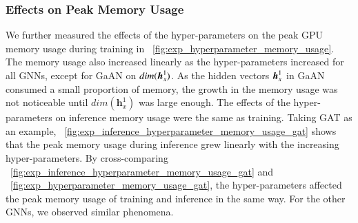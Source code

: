 \subsubsection{Effects on Peak Memory Usage}

We further measured the effects of the hyper-parameters on the peak GPU memory usage during training in \figurename~\ref{fig:exp_hyperparameter_memory_usage}.
%
The memory usage also increased linearly as the hyper-parameters increased for all GNNs, except for GaAN on $dim(\boldsymbol{h}^1_x)$.
%
As the hidden vectors $\boldsymbol{h}^1_x$ in GaAN consumed a small proportion of memory, the growth in the memory usage was not noticeable until $dim(\boldsymbol{h}^1_x)$ was large enough.
%
The effects of the hyper-parameters on inference memory usage were the same as training.
%
Taking GAT as an example, \figurename~\ref{fig:exp_inference_hyperparameter_memory_usage_gat} shows that the peak memory usage during inference grew linearly with the increasing hyper-parameters.
%
By cross-comparing \figurename~\ref{fig:exp_inference_hyperparameter_memory_usage_gat} and \figurename~\ref{fig:exp_hyperparameter_memory_usage_gat}, the hyper-parameters affected the peak memory usage of training and inference in the same way.
%
For the other GNNs, we observed similar phenomena.

